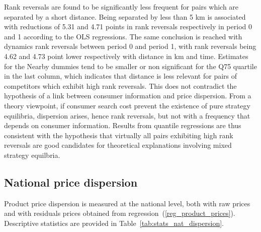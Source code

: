 \documentclass[english]{article}
\begin{document}
Rank reversals are found to be significantly less frequent for pairs which are separated by a short distance. Being separated by less than 5 km is associated with reductions of 5.31 and 4.71 points in rank reversals respectively in period 0 and 1 according to the OLS regressions. The same conclusion is reached with dynamics rank reversals between period 0 and period 1, with rank reversals being 4.62 and 4.73 point lower respectively with distance in km and time. Estimates for the Nearby dummies tend to be smaller or non significant for the Q75 quartile in the last column, which indicates that distance is less relevant for pairs of competitors which exhibit high rank reversals. This does not contradict the hypothesis of a link between consumer information and price dispersion. From a theory viewpoint, if consumer search cost prevent the existence of pure strategy equilibria, dispersion arises, hence rank reversals, but not with a frequency that depends on consumer information. Results from quantile regressions are thus consistent with the hypothesis that virtually all pairs exhibiting high rank reversals are good candidates for theoretical explanations involving mixed strategy equilbria.

\subsection{National price dispersion}

Product price dispersion is measured at the national level, both with raw prices and with residuals prices obtained from regression~(\ref{reg_product_prices}). Descriptive statistics are provided in Table~\ref{tab:stats_nat_dispersion}.
\end{document}
